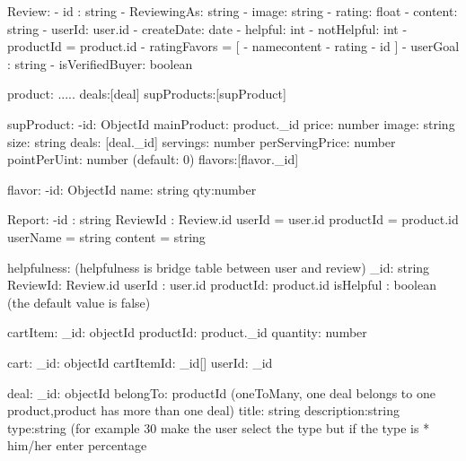 Review:
    - id : string
    - ReviewingAs: string
    - image: string
    - rating: float
    - content: string
    - userId: user.id
    - createDate: date
    - helpful: int
    - notHelpful: int
    - productId = product.id 
    - ratingFavors = [{
        - namecontent
        - rating
        - id
    }]
    - userGoal : string
    - isVerifiedBuyer: boolean

product:
    .....
    deals:[deal]
    supProducts:[supProduct]

supProduct:
    -id: ObjectId
    mainProduct: product._id
    price: number
    image: string
    size: string
    deals: [deal._id]
    servings: number
    perServingPrice: number
    pointPerUint: number (default: 0)
    flavors:[flavor._id] 

flavor:
    -id: ObjectId
    name: string
    qty:number


Report:
    -id : string
    ReviewId : Review.id
    userId = user.id
    productId = product.id
    userName = string
    content = string

helpfulness: (helpfulness is bridge table between user and review)
    _id: string
    ReviewId: Review.id
    userId : user.id
    productId: product.id
    isHelpful : boolean (the default value is false)

cartItem:
    _id: objectId
    productId: product._id
    quantity: number

cart: 
    _id: objectId
    cartItemId: _id[]
    userId: _id

deal:
    _id: objectId
    belongTo: productId (oneToMany, one deal belongs to one
                        product,product has more than one deal)
    title: string
    description:string
    type:string (for example 30%
        make the user select the type but if the type is *%
        him/her enter percentage

